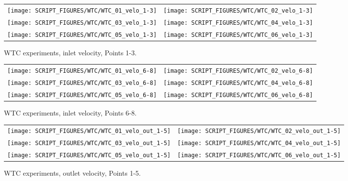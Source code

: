 \newpage

\begin{figure}[p]
\begin{tabular*}{\textwidth}{l@{\extracolsep{\fill}}r}
\texttt{[image: SCRIPT\_FIGURES/WTC/WTC\_01\_velo\_1-3]} &
\texttt{[image: SCRIPT\_FIGURES/WTC/WTC\_02\_velo\_1-3]} \\
\texttt{[image: SCRIPT\_FIGURES/WTC/WTC\_03\_velo\_1-3]} &
\texttt{[image: SCRIPT\_FIGURES/WTC/WTC\_04\_velo\_1-3]} \\
\texttt{[image: SCRIPT\_FIGURES/WTC/WTC\_05\_velo\_1-3]} &
\texttt{[image: SCRIPT\_FIGURES/WTC/WTC\_06\_velo\_1-3]}
\end{tabular*}
\caption{WTC experiments, inlet velocity, Points 1-3.}
\label{WTC_velo_1-3}
\end{figure}

\begin{figure}[p]
\begin{tabular*}{\textwidth}{l@{\extracolsep{\fill}}r}
\texttt{[image: SCRIPT\_FIGURES/WTC/WTC\_01\_velo\_6-8]} &
\texttt{[image: SCRIPT\_FIGURES/WTC/WTC\_02\_velo\_6-8]} \\
\texttt{[image: SCRIPT\_FIGURES/WTC/WTC\_03\_velo\_6-8]} &
\texttt{[image: SCRIPT\_FIGURES/WTC/WTC\_04\_velo\_6-8]} \\
\texttt{[image: SCRIPT\_FIGURES/WTC/WTC\_05\_velo\_6-8]} &
\texttt{[image: SCRIPT\_FIGURES/WTC/WTC\_06\_velo\_6-8]}
\end{tabular*}
\caption{WTC experiments, inlet velocity, Points 6-8.}
\label{WTC_velo_6-8}
\end{figure}

\begin{figure}[p]
\begin{tabular*}{\textwidth}{l@{\extracolsep{\fill}}r}
\texttt{[image: SCRIPT\_FIGURES/WTC/WTC\_01\_velo\_out\_1-5]} &
\texttt{[image: SCRIPT\_FIGURES/WTC/WTC\_02\_velo\_out\_1-5]} \\
\texttt{[image: SCRIPT\_FIGURES/WTC/WTC\_03\_velo\_out\_1-5]} &
\texttt{[image: SCRIPT\_FIGURES/WTC/WTC\_04\_velo\_out\_1-5]} \\
\texttt{[image: SCRIPT\_FIGURES/WTC/WTC\_05\_velo\_out\_1-5]} &
\texttt{[image: SCRIPT\_FIGURES/WTC/WTC\_06\_velo\_out\_1-5]}
\end{tabular*}
\caption{WTC experiments, outlet velocity, Points 1-5.}
\label{WTC_velo_out_1-5}
\end{figure}

